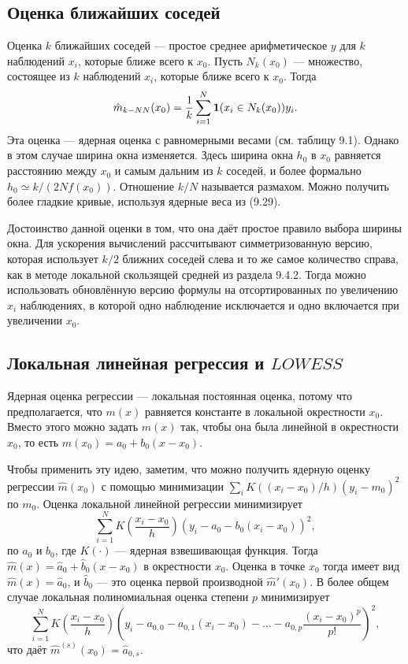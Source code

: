 \subsection{Оценка ближайших соседей}

Оценка $k$ ближайших соседей --- простое среднее арифметическое $y$ для $k$ наблюдений $x_i$, которые ближе всего к $x_0$. Пусть $N_k(x_0)$ --- множество, состоящее из $k$ наблюдений $x_i$, которые ближе всего к $x_0$. Тогда
\begin{equation}
\hat{m}_{k - NN}(x_0) = \frac{1}{k} \sum_{i=1}^N {\bf{1}}(x_i \in N_k(x_0))y_i.
\end{equation}
Эта оценка --- ядерная оценка с равномерными весами (см. таблицу 9.1). Однако в этом случае ширина окна изменяется. Здесь ширина окна $h_0$ в $x_0$ равняется расстоянию между $x_0$ и самым дальним из $k$ соседей, и более формально $h_0 \simeq k/(2Nf(x_0))$. Отношение $k/N$ называется размахом. Можно получить более гладкие кривые, используя ядерные веса из (9.29).

Достоинство данной оценки в том, что она даёт простое правило выбора ширины окна. Для ускорения вычислений рассчитывают симметризованную версию, которая использует $k/2$ ближних соседей слева и то же самое количество справа, как в методе локальной скользящей средней из раздела 9.4.2. Тогда можно использовать обновлённую версию формулы на отсортированных по увеличению $x_i$ наблюдениях, в которой одно наблюдение исключается и одно включается при увеличении $x_0$.  

\subsection{Локальная линейная регрессия и $LOWESS$}

Ядерная оценка регрессии --- локальная постоянная оценка, потому что предполагается, что $m(x)$ равняется константе в локальной окрестности $x_0$. Вместо этого можно задать $m(x)$ так, чтобы она была линейной в окрестности $x_0$, то есть $m(x_0) = a_0 + b_0(x - x_0)$.

Чтобы применить эту идею, заметим, что можно получить ядерную оценку регрессии $\hat{m}(x_0)$ с помощью минимизации $\sum_i K((x_i - x_0)/h)(y_i - m_0)^2$ по $m_0$. Оценка локальной линейной регрессии минимизирует 
\begin{equation}
\sum_{i=1}^N K \left( \frac{x_i - x_0}{h} \right) (y_i - a_0 - b_0(x_i - x_0))^2,
\end{equation}
по $a_0$ и $b_0$, где $K(\cdot)$ --- ядерная взвешивающая функция. Тогда $\hat{m}(x) = \hat{a}_0 + \hat{b}_0(x - x_0)$ в окрестности $x_0$. Оценка в точке $x_0$ тогда имеет вид $\hat{m}(x) = \hat{a}_0$, и $\hat{b}_0$ --- это оценка первой производной $\hat{m}'(x_0)$. В более общем случае локальная полиномиальная оценка степени $p$ минимизирует
\begin{equation}
\sum_{i=1}^N K \left( \frac{x_i - x_0}{h} \right) (y_i - a_{0,0} - a_{0,1}(x_i - x_0) - \dots - a_{0,p} \frac{(x_i - x_0)^p}{p!})^2,
\end{equation}
что даёт $\hat{m}^{(s)}(x_0) = \hat{a}_{0,s}$. 

